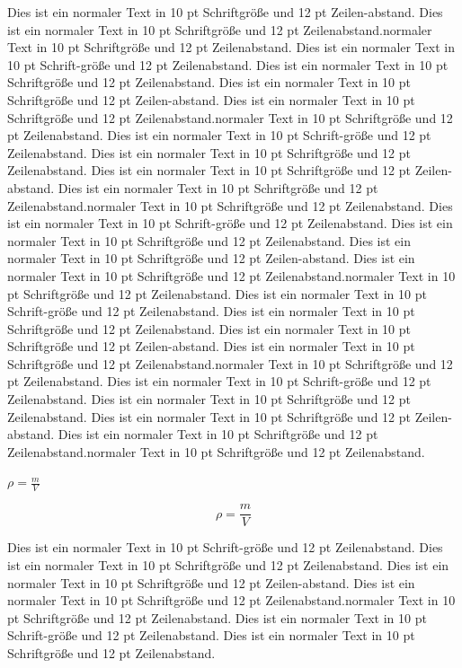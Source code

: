 \documentclass[10pt,a4paper,oneside,abstracton]{scrartcl}
\begin{document}
\begin{multicols}{2}
 Dies ist ein normaler Text in 10 pt Schriftgröße und 12 pt Zeilen-abstand. Dies ist ein normaler Text in 10 pt Schriftgröße und 12 pt Zeilenabstand.normaler Text in 10 pt Schriftgröße und 12 pt Zeilenabstand. Dies ist ein normaler Text in 10 pt Schrift-größe und 12 pt Zeilenabstand. Dies ist ein normaler Text in 10 pt Schriftgröße und 12 pt Zeilenabstand.
 Dies ist ein normaler Text in 10 pt Schriftgröße und 12 pt Zeilen-abstand. Dies ist ein normaler Text in 10 pt Schriftgröße und 12 pt Zeilenabstand.normaler Text in 10 pt Schriftgröße und 12 pt Zeilenabstand. Dies ist ein normaler Text in 10 pt Schrift-größe und 12 pt Zeilenabstand. Dies ist ein normaler Text in 10 pt Schriftgröße und 12 pt Zeilenabstand.
 Dies ist ein normaler Text in 10 pt Schriftgröße und 12 pt Zeilen-abstand. Dies ist ein normaler Text in 10 pt Schriftgröße und 12 pt Zeilenabstand.normaler Text in 10 pt Schriftgröße und 12 pt Zeilenabstand. Dies ist ein normaler Text in 10 pt Schrift-größe und 12 pt Zeilenabstand. Dies ist ein normaler Text in 10 pt Schriftgröße und 12 pt Zeilenabstand.
 Dies ist ein normaler Text in 10 pt Schriftgröße und 12 pt Zeilen-abstand. Dies ist ein normaler Text in 10 pt Schriftgröße und 12 pt Zeilenabstand.normaler Text in 10 pt Schriftgröße und 12 pt Zeilenabstand. Dies ist ein normaler Text in 10 pt Schrift-größe und 12 pt Zeilenabstand. Dies ist ein normaler Text in 10 pt Schriftgröße und 12 pt Zeilenabstand.
 Dies ist ein normaler Text in 10 pt Schriftgröße und 12 pt Zeilen-abstand. Dies ist ein normaler Text in 10 pt Schriftgröße und 12 pt Zeilenabstand.normaler Text in 10 pt Schriftgröße und 12 pt Zeilenabstand. Dies ist ein normaler Text in 10 pt Schrift-größe und 12 pt Zeilenabstand. Dies ist ein normaler Text in 10 pt Schriftgröße und 12 pt Zeilenabstand.
 Dies ist ein normaler Text in 10 pt Schriftgröße und 12 pt Zeilen-abstand. Dies ist ein normaler Text in 10 pt Schriftgröße und 12 pt Zeilenabstand.normaler Text in 10 pt Schriftgröße und 12 pt Zeilenabstand. 


$\rho = \frac{m}{V}$




\begin{equation}
{\rho = \frac{m}{V}}
\end{equation}

Dies ist ein normaler Text in 10 pt Schrift-größe und 12 pt Zeilenabstand. Dies ist ein normaler Text in 10 pt Schriftgröße und 12 pt Zeilenabstand.
 Dies ist ein normaler Text in 10 pt Schriftgröße und 12 pt Zeilen-abstand. Dies ist ein normaler Text in 10 pt Schriftgröße und 12 pt Zeilenabstand.normaler Text in 10 pt Schriftgröße und 12 pt Zeilenabstand. Dies ist ein normaler Text in 10 pt Schrift-größe und 12 pt Zeilenabstand. Dies ist ein normaler Text in 10 pt Schriftgröße und 12 pt Zeilenabstand. 
 

\end{multicols}
\end{document}

